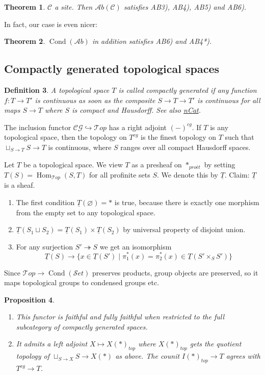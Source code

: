\documentclass[12pt]{article}
\theoremstyle{darkgreentheorem}
\newtheorem{thm}{Theorem}[section]
\newtheorem{prop}[thm]{Proposition}
\theoremstyle{darkbluedefinition}
\newtheorem{defn}[thm]{Definition}
\theoremstyle{darkredexample}
\theoremstyle{remark}
\newcommand{\1}{\mathbbm{1}}
\newcommand{\scrC}{\mathscr{C}}
\newcommand{\Top}{\mathscr{T}op}
\newcommand{\CG}{\mathscr{CG}}
\newcommand{\Ab}{\mathscr{A}b}
\newcommand{\Set}{\mathscr{S}et}
\DeclareMathOperator{\Hom}{Hom}
\DeclareMathOperator{\Cond}{Cond}
\newcommand{\pe}{*_{proét}}
\renewcommand{\u}[1]{\underline{#1}}
\newcommand{\fp}[1]{\times_{#1}}
\begin{document}
\begin{thm}
    $\scrC$ a site. Then $\Ab(\scrC)$ satisfies AB3), AB4), AB5) and AB6).
\end{thm}

In fact, our case is even nicer:

\begin{thm}
    $\Cond(\Ab)$ in addition satisfies AB6) and AB4*).
\end{thm}

\subsection{Compactly generated topological spaces}

\begin{defn}
    A topological space $T$ is called \textit{compactly generated} if any function $f\colon T\to T'$ is continuous as soon as the composite $S\to T\to T'$ is continuous for all maps $S\to T$ where $S$ is compact and Hausdorff.
    See also \href{https://ncatlab.org/nlab/show/compactly+generated+topological+space}{nCat}.
\end{defn}

The inclusion functor $\CG \hookrightarrow \Top$ has a right adjoint $(-)^{cg}$.
If $T$ is any topological space, then the topology on $T^{cg}$ is the finest topology on $T$ such that $\sqcup_{S\to T}S\to T$ is continuous, where $S$ ranges over all compact Hausdorff spaces.

Let $T$ be a topological space.
We view $T$ as a presheaf on $\pe$ by setting $T(S)=\Hom_{\Top}(S,T)$ for all profinite sets $S$.
We denote this by $\u{T}$.
Claim: $\u{T}$ is a sheaf.
\begin{enumerate}[label=\roman*)]
    \item The first condition $\u{T}(\varnothing)=*$ is true, because there is exactly one morphism from the empty set to any topological space.
    \item $\u{T}(S_{1}\sqcup S_{2})=\u{T}(S_{1})\times \u{T}(S_{2})$ by universal property of disjoint union.
    \item For any surjection $S'\twoheadrightarrow S$ we get an isomorphism
	\[ \u{T}(S)\to \{ x\in \u{T}(S')\mid \pi_{1}^{*}(x)=\pi_{2}^{*}(x)\in \u{T}(S'\fp{S}S')\}\]
\end{enumerate}

Since $\Top\to \Cond(\Set)$ preserves products, group objects are preserved, so it maps topological groups to condensed groups etc.

\begin{prop}
    \begin{enumerate}[label=\roman*)]
	\item This functor is faithful and fully faithful when restricted to the full subcategory of compactly generated spaces.
	\item It admits a left adjoint $X\mapsto X(*)_{top}$ where $X(*)_{top}$ gets the quotient topology of $\sqcup_{S\to X}S\to X(*)$ as above.
	    The counit $I(*)_{top}\to T$ agrees with $T^{cg}\to T$.
    \end{enumerate}
\end{prop}
\end{document}

